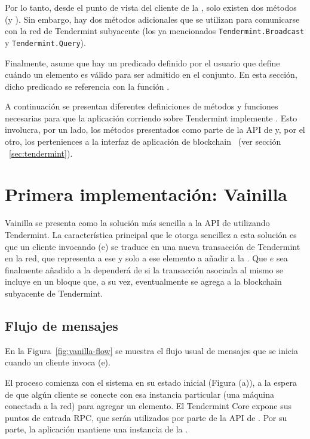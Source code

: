 Por lo tanto, desde el punto de vista del cliente de la \setchain, solo existen dos
métodos (\Add y \Get).
%
Sin embargo, hay dos métodos adicionales que se utilizan para comunicarse con la
red de Tendermint subyacente (los ya mencionados \texttt{Tendermint.Broadcast} y
\texttt{Tendermint.Query}).
%

Finalmente, \setchain asume que hay un predicado definido por el usuario que define
cuándo un elemento es válido para ser admitido en el conjunto.
%
En esta sección, dicho predicado se referencia con la función \isValidElement.

%
A continuación se presentan diferentes definiciones de métodos y funciones
necesarias para que la aplicación corriendo sobre Tendermint implemente \setchain.
Esto involucra, por un lado, los métodos presentados como parte de la API de
\setchain y, por el otro, los perteniences a la interfaz de aplicación de
blockchain ~(ver sección ~\ref{sec:tendermint}).

\section{Primera implementación: Vainilla}\label{sec:vanilla}

Vainilla se presenta como la solución más sencilla a la API de \setchain
utilizando Tendermint.
%
La característica principal que le otorga sencillez a esta solución es que
un cliente invocando \Add(e) se traduce en una nueva transacción de Tendermint en la red,
que representa a ese y solo a ese elemento a añadir a la \setchain.
%
Que $e$ sea finalmente añadido a la \setchain dependerá de si la transacción asociada
al mismo se incluye en un bloque que, a su vez, eventualmente se agrega a la blockchain
subyacente de Tendermint. 

\subsection{Flujo de mensajes}
En la Figura~\ref{fig:vanilla-flow} se muestra el flujo usual de mensajes que se inicia
cuando un cliente invoca \Add(e).
%

El proceso comienza con el sistema en su estado inicial (Figura (a)), a la espera de que algún cliente
se conecte con esa instancia particular (una máquina conectada a la red) para agregar un elemento.
El Tendermint Core expone sus puntos de entrada RPC, que serán utilizados por parte de la API de
\setchain. Por su parte, la aplicación mantiene una instancia de la \setchain.
%

